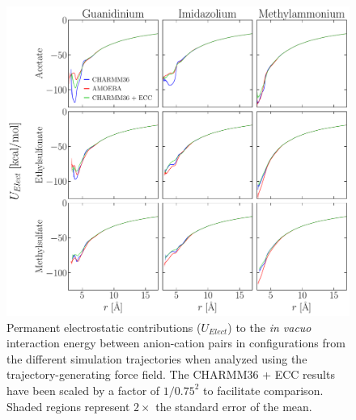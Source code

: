 \documentclass[journal=jacsat,articletitle=true,manuscript=suppinfo,layout=onecolumn]{achemso}
\begin{document}
    \begin{figure}[H]
    \begin{center}
        \includegraphics[width=1\columnwidth]{images/energy_conts_elect.pdf}
        \caption{Permanent electrostatic contributions ($U_{Elect}$) to the \emph{in vacuo} interaction energy between anion-cation pairs in configurations from the different simulation trajectories when analyzed using the trajectory-generating force field. The CHARMM36 + ECC results have been scaled by a factor of $1/0.75^2$ to facilitate comparison. Shaded regions represent $2\times$ the standard error of the mean.}
        \label{fig:energy_conts_elect}
    \end{center}
    \end{figure}
\end{document}
